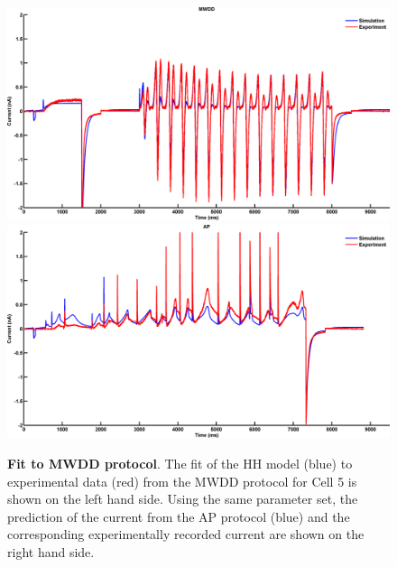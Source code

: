 \documentclass[11pt,a4paper,oneside]{article}
\begin{document}
\begin{figure}[ht]
\begin{center}
\includegraphics[scale=0.42]{Figures/Fig_hh_16713110_FP_maz_wang_div_diff_CP_maz_wang_div_diff.png}
\includegraphics[scale=0.42]{Figures/Fig_hh_16713110_FP_maz_wang_div_diff_CP_ap.png}
\caption{\textbf{Fit to MWDD protocol}. The fit of the HH model (blue) to experimental data (red) from the MWDD protocol  for Cell 5 is shown on the left hand side. Using the same parameter set, the prediction of the current from the AP protocol (blue) and the corresponding experimentally recorded current are shown on the right hand side.} 
\label{Fig_MWDDfit}
\end{center}
\end{figure}
\end{document}
